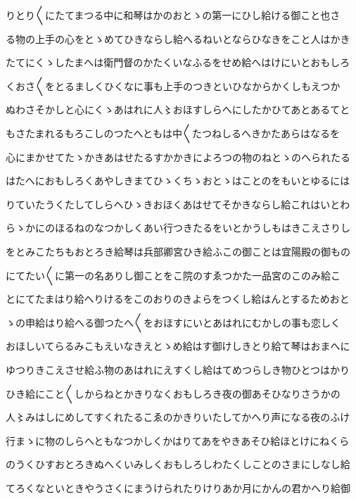 \documentclass[a4paper,11pt,landscape]{ltjtarticle}
\begin{document}
\par\medskip
りとり〱にたてまつる中に和琴はかのおとゝの第一にひし給ける御こと也さ
\par\medskip
る物の上手の心をとゝめてひきならし給へるねいとならひなきをこと人はかき
\par\medskip
たてにくゝしたまへは衛門督のかたくいなふるをせめ給へはけにいとおもしろ
\par\medskip
くおさ〱をとるましくひくなに事も上手のつきといひなからかくしもえつか
\par\medskip
ぬわさそかしと心にくゝあはれに人〻おほすしらへにしたかひてあとあるてと
\par\medskip
もさたまれるもろこしのつたへともは中〱たつねしるへきかたあらはなるを
\par\medskip
心にまかせてたゝかきあはせたるすかかきによろつの物のねとゝのへられたる
\par\medskip
はたへにおもしろくあやしきまてひゝくちゝおとゝはことのをもいとゆるには
\par\medskip
りていたうくたしてしらへひゝきおほくあはせてそかきならし給これはいとわ
\par\medskip
らゝかにのほるねのなつかしくあい行つきたるをいとかうしもはきこえさりし
\par\medskip
をとみこたちもおとろき給琴は兵部卿宮ひき給ふこの御ことは宜陽殿の御もの
\par\medskip
にてたい〱に第一の名ありし御ことをこ院のすゑつかた一品宮のこのみ給こ
\par\medskip
とにてたまはり給へりけるをこのおりのきよらをつくし給はんとするためおと
\par\medskip
ゝの申給はり給へる御つたへ〱をおほすにいとあはれにむかしの事も恋しく
\par\medskip
おほしいてらるみこもえいなきえとゝめ給はす御けしきとり給て琴はおまへに
\par\medskip
ゆつりきこえさせ給ふ物のあはれにえすくし給はてめつらしき物ひとつはかり
\par\medskip
ひき給にこと〱しからねとかきりなくおもしろき夜の御あそひなりさうかの
\par\medskip
人〻みはしにめしてすくれたるこゑのかきりいたしてかへり声になる夜のふけ
\par\medskip
行まゝに物のしらへともなつかしくかはりてあをやきあそひ給ほとけにねくら
\par\medskip
のうくひすおとろきぬへくいみしくおもしろしわたくしことのさまにしなし給
\par\medskip
てろくなといときやうさくにまうけられたりけりあか月にかんの君かへり給御
\par\medskip
\end{document}

